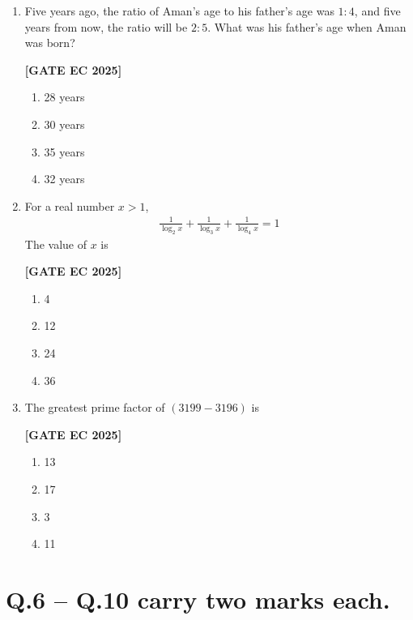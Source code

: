 \documentclass[12pt]{article}
\begin{document}
\begin{enumerate}[leftmargin=1.5em, label=\textbf{Q.\arabic*}., itemsep=2em]
\item Five years ago, the ratio of Aman’s age to his father’s age was $1:4$, and five years from now, the ratio will be $2:5$. What was his father’s age when Aman was born?

\noindent \textbf{[GATE EC 2025]}
\begin{multicols}{2}
\begin{enumerate}
    \item 28 years
    \item 30 years
    \item 35 years
    \item 32 years
\end{enumerate}
\end{multicols}

\item For a real number $x > 1$,
\begin{align*}
\frac{1}{\log_{2} x} + \frac{1}{\log_{3} x} + \frac{1}{\log_{4} x} = 1
\end{align*}
The value of $x$ is

\noindent \textbf{[GATE EC 2025]}
\begin{multicols}{2}
\begin{enumerate}
    \item 4
    \item 12
    \item 24
    \item 36
\end{enumerate}
\end{multicols}

\item The greatest prime factor of $(3199 - 3196)$ is

\noindent \textbf{[GATE EC 2025]}
\begin{multicols}{2}
\begin{enumerate}
    \item 13
    \item 17
    \item 3
    \item 11
\end{enumerate}
\end{multicols}

\end{enumerate}

\section*{Q.6 -- Q.10 carry two marks each.}
\end{document}
